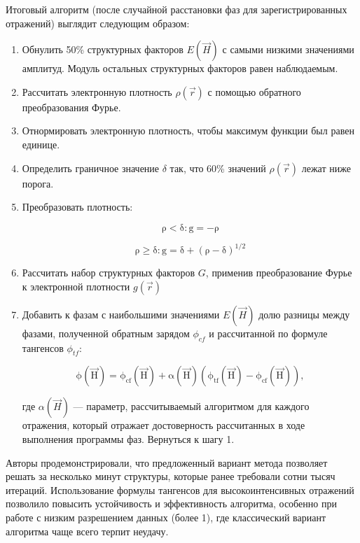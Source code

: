 Итоговый алгоритм (после случайной расстановки фаз для зарегистрированных отражений) выглядит следующим образом:

\begin{enumerate}
	\item Обнулить 50\% структурных факторов $E(\overrightarrow{H})$ с самыми низкими значениями амплитуд. Модуль остальных структурных факторов равен наблюдаемым.
	\item Рассчитать электронную плотность $\rho(\overrightarrow{r})$ с помощью обратного преобразования Фурье.
	\item Отнормировать электронную плотность, чтобы максимум функции был равен единице.
	\item Определить граничное значение $\delta$ так, что 60\% значений $\rho(\overrightarrow{r})$ лежат ниже порога.
	\item Преобразовать плотность:
	
	\begin{equation}
		\mathrm{\rho<\delta: g = -\rho}
	\end{equation}
	 
	\begin{equation}
		\mathrm{\rho\geq\delta: g = \delta + (\rho-\delta)^{1/2}}
	\end{equation}

	\item Рассчитать набор структурных факторов $G$, применив преобразование Фурье к электронной плотности $g(\overrightarrow{r})$
	\item Добавить к фазам с наибольшими значениями $E(\overrightarrow{H})$ долю разницы между фазами, полученной обратным зарядом $\phi_{cf}$ и рассчитанной по формуле тангенсов $\phi_{tf}$:
	
	\begin{equation}
		\mathrm{\phi(\overrightarrow{H}) = \phi_{cf}(\overrightarrow{H})+\alpha(\overrightarrow{H})(\phi_{tf}(\overrightarrow{H})-\phi_{cf}(\overrightarrow{H})),}
	\end{equation}
	 
	 где $\alpha(\overrightarrow{H})$ --- параметр, рассчитываемый алгоритмом для каждого отражения, который отражает достоверность рассчитанных в ходе выполнения программы фаз. Вернуться к шагу 1.
\end{enumerate}

Авторы продемонстрировали, что предложенный вариант метода позволяет решать за несколько минут структуры, которые ранее требовали сотни тысяч итераций. Использование формулы тангенсов для высокоинтенсивных отражений позволило повысить устойчивость и эффективность алгоритма, особенно при работе с низким разрешением данных (более 1\angstrom), где классический вариант алгоритма чаще всего терпит неудачу.

